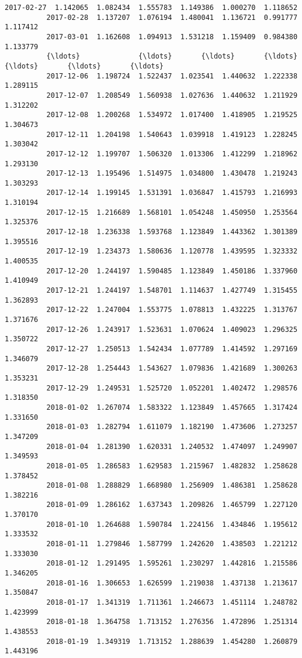\documentclass[11pt]{article}
\begin{document}
\begin{Verbatim}[commandchars=\\\{\}]
          2017-02-27  1.142065  1.082434  1.555783  1.149386  1.000270  1.118652   
          2017-02-28  1.137207  1.076194  1.480041  1.136721  0.991777  1.117412   
          2017-03-01  1.162608  1.094913  1.531218  1.159409  0.984380  1.133779   
          {\ldots}              {\ldots}       {\ldots}       {\ldots}       {\ldots}       {\ldots}       {\ldots}   
          2017-12-06  1.198724  1.522437  1.023541  1.440632  1.222338  1.289115   
          2017-12-07  1.208549  1.560938  1.027636  1.440632  1.211929  1.312202   
          2017-12-08  1.200268  1.534972  1.017400  1.418905  1.219525  1.304673   
          2017-12-11  1.204198  1.540643  1.039918  1.419123  1.228245  1.303042   
          2017-12-12  1.199707  1.506320  1.013306  1.412299  1.218962  1.293130   
          2017-12-13  1.195496  1.514975  1.034800  1.430478  1.219243  1.303293   
          2017-12-14  1.199145  1.531391  1.036847  1.415793  1.216993  1.310194   
          2017-12-15  1.216689  1.568101  1.054248  1.450950  1.253564  1.325376   
          2017-12-18  1.236338  1.593768  1.123849  1.443362  1.301389  1.395516   
          2017-12-19  1.234373  1.580636  1.120778  1.439595  1.323332  1.400535   
          2017-12-20  1.244197  1.590485  1.123849  1.450186  1.337960  1.410949   
          2017-12-21  1.244197  1.548701  1.114637  1.427749  1.315455  1.362893   
          2017-12-22  1.247004  1.553775  1.078813  1.432225  1.313767  1.371676   
          2017-12-26  1.243917  1.523631  1.070624  1.409023  1.296325  1.350722   
          2017-12-27  1.250513  1.542434  1.077789  1.414592  1.297169  1.346079   
          2017-12-28  1.254443  1.543627  1.079836  1.421689  1.300263  1.353231   
          2017-12-29  1.249531  1.525720  1.052201  1.402472  1.298576  1.318350   
          2018-01-02  1.267074  1.583322  1.123849  1.457665  1.317424  1.331650   
          2018-01-03  1.282794  1.611079  1.182190  1.473606  1.273257  1.347209   
          2018-01-04  1.281390  1.620331  1.240532  1.474097  1.249907  1.349593   
          2018-01-05  1.286583  1.629583  1.215967  1.482832  1.258628  1.378452   
          2018-01-08  1.288829  1.668980  1.256909  1.486381  1.258628  1.382216   
          2018-01-09  1.286162  1.637343  1.209826  1.465799  1.227120  1.370170   
          2018-01-10  1.264688  1.590784  1.224156  1.434846  1.195612  1.333532   
          2018-01-11  1.279846  1.587799  1.242620  1.438503  1.221212  1.333030   
          2018-01-12  1.291495  1.595261  1.230297  1.442816  1.215586  1.346205   
          2018-01-16  1.306653  1.626599  1.219038  1.437138  1.213617  1.350847   
          2018-01-17  1.341319  1.711361  1.246673  1.451114  1.248782  1.423999   
          2018-01-18  1.364758  1.713152  1.276356  1.472896  1.251314  1.438553   
          2018-01-19  1.349319  1.713152  1.288639  1.454280  1.260879  1.443196   
          

\end{Verbatim}
\end{document}
